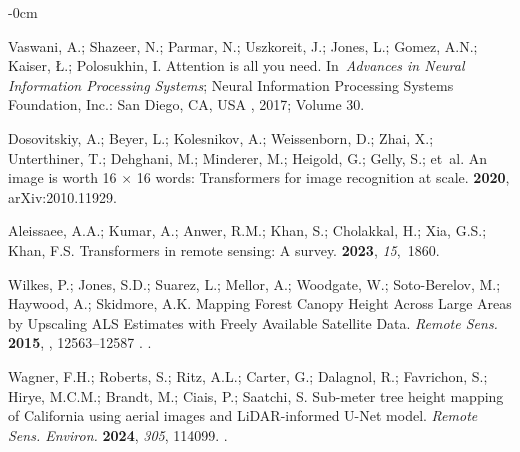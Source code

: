 \documentclass[remotesensing,article,accept,pdftex,moreauthors]{Definitions/mdpi}
\renewcommand{\hl}[1]{#1}
\begin{document}
\begin{adjustwidth}{-\extralength}{0cm}
\begin{thebibliography}{999}
Vaswani, A.; Shazeer, N.; Parmar, N.; Uszkoreit, J.; Jones, L.; Gomez, A.N.;
  Kaiser, {\L}.; Polosukhin, I.
\newblock Attention is all you need.
\newblock In~{\em Advances in Neural Information Processing Systems}; \hl{Neural Information Processing Systems Foundation, Inc.: San Diego, CA, USA}%
, 2017; Volume 30.

Dosovitskiy, A.; Beyer, L.; Kolesnikov, A.; Weissenborn, D.; Zhai, X.;
  Unterthiner, T.; Dehghani, M.; Minderer, M.; Heigold, G.; Gelly, S.;  et~al.
\newblock An image is worth 16 $\times$ 16 words: Transformers for image recognition at
  scale.
 {\bf 2020}, arXiv:2010.11929.

Aleissaee, A.A.; Kumar, A.; Anwer, R.M.; Khan, S.; Cholakkal, H.; Xia, G.S.;
  Khan, F.S.
\newblock Transformers in remote sensing: A survey.
 {\bf 2023}, {\em 15},~1860.

Wilkes, P.; Jones, S.D.; Suarez, L.; Mellor, A.; Woodgate, W.; Soto-Berelov,
  M.; Haywood, A.; Skidmore, A.K.
\newblock Mapping Forest Canopy Height Across Large Areas by Upscaling {ALS}
  Estimates with Freely Available Satellite Data. \emph{\hl{Remote Sens.}%
} {\bf 2015},
, 12563--\hl{12587}%
.
.

Wagner, F.H.; Roberts, S.; Ritz, A.L.; Carter, G.; Dalagnol, R.; Favrichon, S.;
  Hirye, M.C.M.; Brandt, M.; Ciais, P.; Saatchi, S.
\newblock Sub-meter tree height mapping of California using aerial images and
  {LiDAR}-informed U-Net model. \emph{\hl{Remote Sens. Environ.}} {\bf 2024}, {\em 305}, 114099.
.


\end{thebibliography}
\end{adjustwidth}
\end{document}
